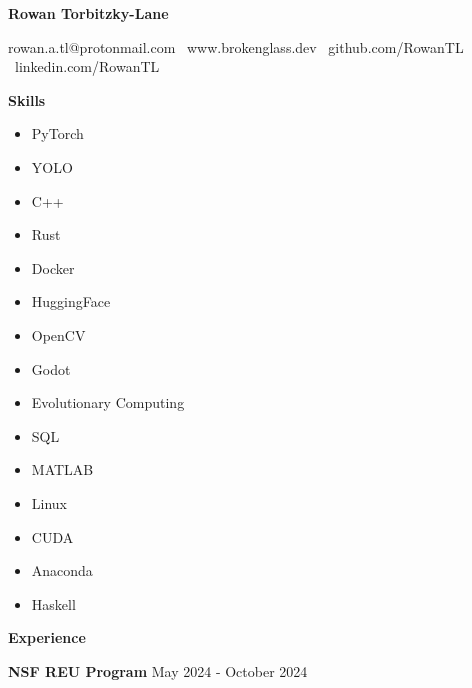 \documentclass[11pt]{article}
\begin{document}
\begin{center}
    \textbf{\huge Rowan Torbitzky-Lane}\\
    \hrulefill
\end{center}

\begin{center}
    rowan.a.tl@protonmail.com \textbullet \ www.brokenglass.dev \textbullet \ github.com/RowanTL \textbullet  \ linkedin.com/RowanTL
\end{center}


\begin{center}
    \textbf{Skills}
\end{center}

\begin{multicols}{3}
    \begin{itemize}[noitemsep, topsep=0pt, partopsep=0pt, parsep=0pt, itemsep=0pt]
        \item PyTorch
        \item YOLO
        \item C++
        \item Rust
        \item Docker
        \item HuggingFace
        \item OpenCV
        \item Godot
        \item Evolutionary Computing
        \item SQL
        \item MATLAB
        \item Linux
        \item CUDA
        \item Anaconda
        \item Haskell
    \end{itemize}
\end{multicols}

\begin{center}
    \textbf{Experience}
\end{center}

\textbf{NSF REU Program} \hfill May 2024 - October 2024
\end{document}
